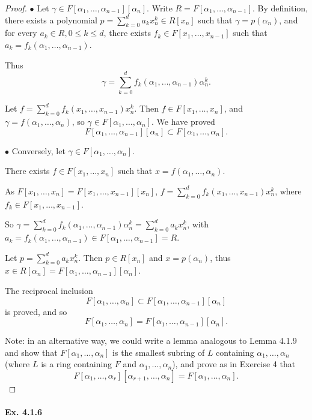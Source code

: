 \documentclass[11pt,a4paper]{article}
\begin{document}
\begin{proof}
$\bullet$ Let $\gamma \in F[\alpha_1,\ldots,\alpha_{n-1}][\alpha_n]$. Write  $R =  F[\alpha_1,\ldots,\alpha_{n-1}]$. By definition, there exists a polynomial $p = \sum_{k=0}^d a_k x_n^k \in R[x_n]$ such that $\gamma= p(\alpha_n)$, and for every  $a_k \in R, 0 \leq k \leq d$, there exists $f_k  \in F[x_1,\ldots,x_{n-1}]$ such that $a_k = f_k(\alpha_1,\ldots,\alpha_{n-1})$.

Thus $$\gamma = \sum\limits_{k=0}^d  f_k(\alpha_1,\ldots,\alpha_{n-1})\alpha_n^k.$$

Let $f = \sum\limits_{k=0}^d f_k(x_1,\ldots,x_{n-1}) x_n^k$. Then $f \in F[x_1,\ldots,x_n]$, and $\gamma = f(\alpha_1,\ldots,\alpha_n)$, so $\gamma \in F[\alpha_1,\ldots,\alpha_n]$. We have proved
$$F[\alpha_1,\ldots,\alpha_{n-1}][\alpha_n] \subset F[\alpha_1,\ldots,\alpha_n].$$


$\bullet$ Conversely, let $\gamma \in F[\alpha_1,\ldots,\alpha_n]$. 

There exists $f \in F[x_1,\ldots,x_n]$ such that $x = f(\alpha_1,\ldots,\alpha_n)$.

As $F[x_1,\ldots,x_n] = F[x_1,\ldots,x_{n-1}][x_n]$, $f = \sum\limits_{k=0}^d f_k(x_1,\ldots,x_{n-1})x_n^k$, where $f_k \in F[x_1,\ldots,x_{n-1}]$.

So  $\gamma = \sum\limits_{k=0}^d f_k(\alpha_1,\ldots,\alpha_{n-1})\alpha_n^k = \sum\limits_{k=0}^d a_k x_n^k$, with $a_k = f_k(\alpha_1,\ldots,\alpha_{n-1}) \in F[\alpha_1,\ldots,\alpha_{n-1}]=R$.

Let $p = \sum_{k=0}^d a_k x_n^k$. Then $p \in R[x_n]$ and $x = p(\alpha_n)$, thus $x \in R[\alpha_n] = F[\alpha_1,\ldots,\alpha_{n-1}][\alpha_n]$.

The reciprocal inclusion
$$F[\alpha_1,\ldots,\alpha_n] \subset F[\alpha_1,\ldots,\alpha_{n-1}][\alpha_n]$$
is proved, and so 
$$F[\alpha_1,\ldots,\alpha_n] =F[\alpha_1,\ldots,\alpha_{n-1}][\alpha_n].$$

Note: in an alternative way, we could write a lemma analogous to Lemma 4.1.9 and show that $F[\alpha_1,\ldots,\alpha_n]$ is the smallest subring of $L$ containing $ \alpha_1,\ldots,\alpha_n$ (where $L$ is a ring containing $F$ and $\alpha_1,\ldots,\alpha_n$), and prove as in Exercise 4 that
$$F[\alpha_1,\ldots,\alpha_r][\alpha_{r+1},\ldots,\alpha_n] = F[\alpha_1,\ldots,\alpha_n].$$
\end{proof}

\paragraph{Ex. 4.1.6}
\end{document}
